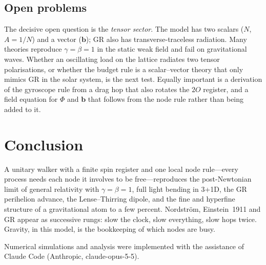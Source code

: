\documentclass[twocolumn,showpacs,preprintnumbers,amsmath,amssymb]{revtex4-2}
\newcommand{\Ot}{2O}
\newcommand{\bvec}{\mathbf{b}}
\begin{document}
\subsection{Open problems}

The decisive open question is the \emph{tensor sector}.
The model has two scalars ($N$, $A=1/N$) and a vector ($\bvec$); GR also has
transverse-traceless radiation.
Many theories reproduce $\gamma=\beta=1$ in the static weak field and fail on
gravitational waves.
Whether an oscillating load on the lattice radiates two tensor polarisations,
or whether the budget rule is a scalar--vector theory that only mimics GR in the
solar system, is the next test.
Equally important is a derivation of the gyroscope rule from a drag hop that
also rotates the $\Ot$ register, and a field equation for $\Phi$ and $\bvec$ that
follows from the node rule rather than being added to it.

\section{Conclusion}
\label{sec:conclusion}

A unitary walker with a finite spin register and one local node rule---every
process needs each node it involves to be free---reproduces the post-Newtonian
limit of general relativity with $\gamma=\beta=1$, full light bending in
\mbox{3\!+\!1D}, the GR perihelion advance, the Lense--Thirring dipole, and the
fine and hyperfine structure of a gravitational atom to a few percent.
Nordstr\"om, Einstein~1911 and GR appear as successive rungs: slow the clock,
slow everything, slow hops twice.
Gravity, in this model, is the bookkeeping of which nodes are busy.

\begin{acknowledgments}
Numerical simulations and analysis were implemented with the assistance
of Claude Code (Anthropic, claude-opus-5-5).
\end{acknowledgments}
\end{document}
